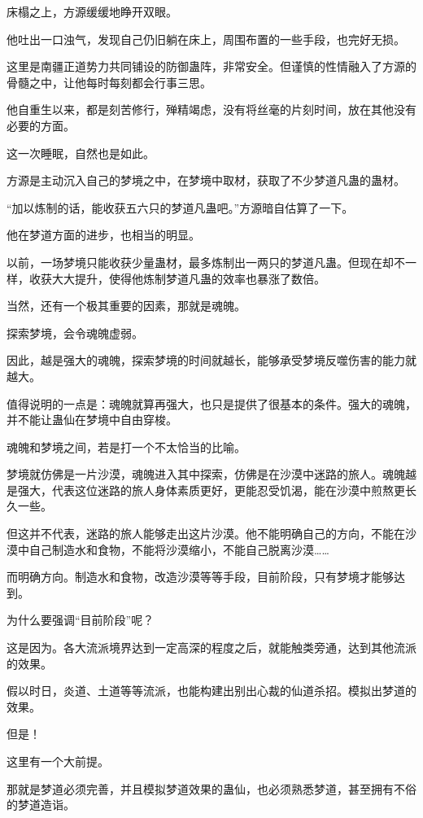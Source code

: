 
\begin{this_body}

床榻之上，方源缓缓地睁开双眼。

他吐出一口浊气，发现自己仍旧躺在床上，周围布置的一些手段，也完好无损。

这里是南疆正道势力共同铺设的防御蛊阵，非常安全。但谨慎的性情融入了方源的骨髓之中，让他每时每刻都会行事三思。

他自重生以来，都是刻苦修行，殚精竭虑，没有将丝毫的片刻时间，放在其他没有必要的方面。

这一次睡眠，自然也是如此。

方源是主动沉入自己的梦境之中，在梦境中取材，获取了不少梦道凡蛊的蛊材。

“加以炼制的话，能收获五六只的梦道凡蛊吧。”方源暗自估算了一下。

他在梦道方面的进步，也相当的明显。

以前，一场梦境只能收获少量蛊材，最多炼制出一两只的梦道凡蛊。但现在却不一样，收获大大提升，使得他炼制梦道凡蛊的效率也暴涨了数倍。

当然，还有一个极其重要的因素，那就是魂魄。

探索梦境，会令魂魄虚弱。

因此，越是强大的魂魄，探索梦境的时间就越长，能够承受梦境反噬伤害的能力就越大。

值得说明的一点是：魂魄就算再强大，也只是提供了很基本的条件。强大的魂魄，并不能让蛊仙在梦境中自由穿梭。

魂魄和梦境之间，若是打一个不太恰当的比喻。

梦境就仿佛是一片沙漠，魂魄进入其中探索，仿佛是在沙漠中迷路的旅人。魂魄越是强大，代表这位迷路的旅人身体素质更好，更能忍受饥渴，能在沙漠中煎熬更长久一些。

但这并不代表，迷路的旅人能够走出这片沙漠。他不能明确自己的方向，不能在沙漠中自己制造水和食物，不能将沙漠缩小，不能自己脱离沙漠……

而明确方向。制造水和食物，改造沙漠等等手段，目前阶段，只有梦境才能够达到。

为什么要强调“目前阶段”呢？

这是因为。各大流派境界达到一定高深的程度之后，就能触类旁通，达到其他流派的效果。

假以时日，炎道、土道等等流派，也能构建出别出心裁的仙道杀招。模拟出梦道的效果。

但是！

这里有一个大前提。

那就是梦道必须完善，并且模拟梦道效果的蛊仙，也必须熟悉梦道，甚至拥有不俗的梦道造诣。


\end{this_body}
